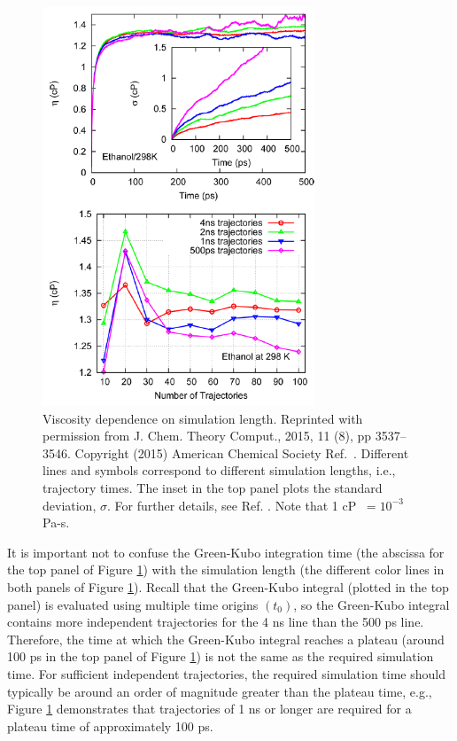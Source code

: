 \documentclass[9pt,bestpractices]{livecoms}
\begin{document}
\begin{figure}[htb!]
	\centering
	\includegraphics[width=3.2in]{ZhangFig8.png}
	\caption{Viscosity dependence on simulation length. Reprinted with permission from J. Chem. Theory Comput., 2015, 11 (8), pp 3537–3546. Copyright (2015) American Chemical Society Ref.\ \cite{Zhang2015}. Different lines and symbols correspond to different simulation lengths, i.e., trajectory times. The inset in the top panel plots the standard deviation, $\sigma$. For further details, see Ref. \cite{Zhang2015}. Note that 1 cP $\ = 10^{-3}$ Pa-s.}
	\label{fig:ZhangFig8}
\end{figure}

It is important not to confuse the Green-Kubo integration time (the abscissa for the top panel of Figure \ref{fig:ZhangFig8}) with the simulation length (the different color lines in both panels of Figure \ref{fig:ZhangFig8}). Recall that the Green-Kubo integral (plotted in the top panel) is evaluated using multiple time origins $(t_0)$, so the Green-Kubo integral contains more independent trajectories for the 4 ns line than the 500 ps line. Therefore, the time at which the Green-Kubo integral reaches a plateau (around 100 ps in the top panel of Figure \ref{fig:ZhangFig8}) is not the same as the required simulation time. For sufficient independent trajectories, the required simulation time should typically be around an order of magnitude greater than the plateau time, e.g., Figure \ref{fig:ZhangFig8} demonstrates that trajectories of 1 ns or longer are required for a plateau time of approximately 100 ps.
\end{document}
